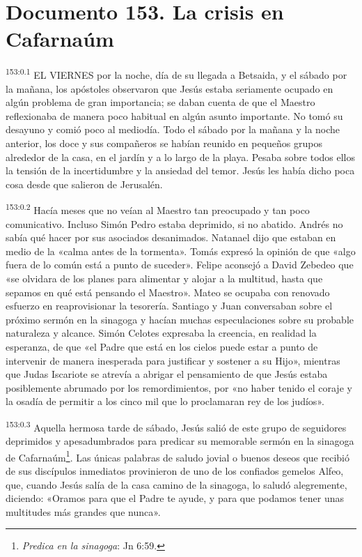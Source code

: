 \chapter{Documento 153. La crisis en Cafarnaúm}
\par 
\textsuperscript{153:0.1} EL VIERNES por la noche, día de su llegada a Betsaida, y el sábado por la mañana, los apóstoles observaron que Jesús estaba seriamente ocupado en algún problema de gran importancia; se daban cuenta de que el Maestro reflexionaba de manera poco habitual en algún asunto importante. No tomó su desayuno y comió poco al mediodía. Todo el sábado por la mañana y la noche anterior, los doce y sus compañeros se habían reunido en pequeños grupos alrededor de la casa, en el jardín y a lo largo de la playa. Pesaba sobre todos ellos la tensión de la incertidumbre y la ansiedad del temor. Jesús les había dicho poca cosa desde que salieron de Jerusalén.

\par 
\textsuperscript{153:0.2} Hacía meses que no veían al Maestro tan preocupado y tan poco comunicativo. Incluso Simón Pedro estaba deprimido, si no abatido. Andrés no sabía qué hacer por sus asociados desanimados. Natanael dijo que estaban en medio de la «calma antes de la tormenta». Tomás expresó la opinión de que «algo fuera de lo común está a punto de suceder». Felipe aconsejó a David Zebedeo que «se olvidara de los planes para alimentar y alojar a la multitud, hasta que sepamos en qué está pensando el Maestro». Mateo se ocupaba con renovado esfuerzo en reaprovisionar la tesorería. Santiago y Juan conversaban sobre el próximo sermón en la sinagoga y hacían muchas especulaciones sobre su probable naturaleza y alcance. Simón Celotes expresaba la creencia, en realidad la esperanza, de que «el Padre que está en los cielos puede estar a punto de intervenir de manera inesperada para justificar y sostener a su Hijo», mientras que Judas Iscariote se atrevía a abrigar el pensamiento de que Jesús estaba posiblemente abrumado por los remordimientos, por «no haber tenido el coraje y la osadía de permitir a los cinco mil que lo proclamaran rey de los judíos».

\par 
\textsuperscript{153:0.3} Aquella hermosa tarde de sábado, Jesús salió de este grupo de seguidores deprimidos y apesadumbrados para predicar su memorable sermón en la sinagoga de Cafarnaúm\footnote{\textit{Predica en la sinagoga}: Jn 6:59.}. Las únicas palabras de saludo jovial o buenos deseos que recibió de sus discípulos inmediatos provinieron de uno de los confiados gemelos Alfeo, que, cuando Jesús salía de la casa camino de la sinagoga, lo saludó alegremente, diciendo: «Oramos para que el Padre te ayude, y para que podamos tener unas multitudes más grandes que nunca».

